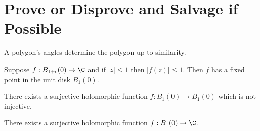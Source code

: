 \documentclass{homework}
\begin{document}
\section{Prove or Disprove and Salvage if Possible}

\begin{problem}
  A polygon's angles determine the polygon up to similarity.
\end{problem}

\begin{problem}
  Suppose $f : B_{1+\epsilon}(0) \to \C$ and if $|z| \leq 1$ then
  $|f(z)| \leq 1$.  Then $f$ has a fixed point in the unit disk
  $B_1(0)$.
\end{problem}

\begin{problem}
  There exists a surjective holomorphic function
  $f : B_1(0) \to B_1(0)$ which is not injective.
\end{problem}

\begin{problem}
  There exists a surjective holomorphic function $f : B_1(0) \to \C$.
\end{problem}
\end{document}
